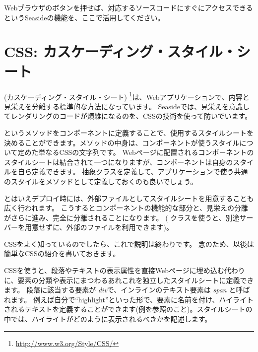\documentclass[a4paper,10pt,twoside]{book}
\begin{document}
Webブラウザのボタンを押せば、対応するソースコードにすぐにアクセスできるというSeasideの機能を、ここで活用してください。

\section{CSS: カスケーディング・スタイル・シート}


(カスケーディング・スタイル・シート) \footnote{\url{http://www.w3.org/Style/CSS/}}は、Webアプリケーションで、内容と見栄えを分離する標準的な方法になっています。
Seasideでは、見栄えを意識してレンダリングのコードが煩雑になるのを、CSSの技術を使って防いでいます。

というメソッドをコンポーネントに定義することで、使用するスタイルシートを決めることができます。メソッドの中身は、コンポーネントが使うスタイルについて定めた単なるCSSの文字列です。
Webページに配置されるコンポーネントのスタイルシートは結合されて一つになりますが、コンポーネントは自身のスタイルを自ら定義できます。
抽象クラスを定義して、アプリケーションで使う共通のスタイルをメソッドとして定義しておくのも良いでしょう。

とはいえデプロイ時には、外部ファイルとしてスタイルシートを用意することも広く行われます。
こうするとコンポーネントの機能的な部分と、見栄えの分離がさらに進み、完全に分離されることになります。
( クラスを使うと、別途サーバーを用意せずに、外部のファイルを利用できます)。

CSSをよく知っているのでしたら、これで説明は終わりです。
念のため、以後は簡単なCSSの紹介を書いておきます。

CSSを使うと、段落やテキストの表示属性を直接Webページに埋め込む代わりに、要素の分類や表示にまつわるあれこれを独立したスタイルシートに定義できます。
段落に該当する要素が \emph{div}で、インラインのテキスト要素は \emph{span} と呼ばれます。
例えば自分で``highlight''といった形で、要素に名前を付け、ハイライトされるテキストを定義することができます(例を参照のこと)。スタイルシートの中では、ハイライトがどのように表示されるべきかを記述します。
\end{document}
